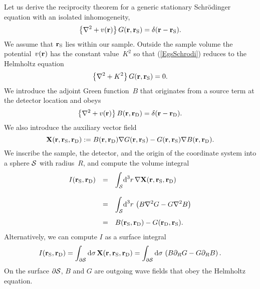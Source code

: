 Let us derive the reciprocity theorem
for a generic stationary Schrödinger equation
with an isolated inhomogeneity,
\begin{equation}\label{EgsSchrodi}
  \left\{\mathbf{\nabla}^2+v(\mathbf{r})\right\}G(\mathbf{r},\mathbf{r}_\text{S}) = \delta(\mathbf{r}-\mathbf{r}_\text{S}).
\end{equation}
We assume that $\mathbf{r}_\text{S}$ lies within our sample.
Outside the sample volume
the potential~$v(\mathbf{r})$ has the constant value~$K^2$
so that (\ref{EgsSchrodi})
reduces to the Helmholtz equation%
\begin{equation}\label{EgsSchrodiHelmh}
  \left\{\mathbf{\nabla}^2+K^2\right\}G(\mathbf{r},\mathbf{r}_\text{S}) = 0.
\end{equation}
We introduce the adjoint Green function~$B$
%
that originates from a source term at the detector location
and obeys
\begin{equation}\label{EgsSchrodiAdj}
  \left\{\mathbf{\nabla}^2+v(\mathbf{r})\right\}B(\mathbf{r},\mathbf{r}_\text{D}) = \delta(\mathbf{r}-\mathbf{r}_\text{D}).
\end{equation}
We also introduce the auxiliary vector field
\begin{equation}
  \mathbf{X}(\mathbf{r},\mathbf{r}_\text{S},\mathbf{r}_\text{D}):=B(\mathbf{r},\mathbf{r}_\text{D})\mathbf{\nabla} G(\mathbf{r},\mathbf{r}_\text{S}) - G(\mathbf{r},\mathbf{r}_\text{S})\mathbf{\nabla} B(\mathbf{r},\mathbf{r}_\text{D}).
\end{equation}
%
We inscribe the sample, the detector, and the origin of the coordinate system
into a sphere $\mathcal{S}$ with radius~$R$,
%
%
and compute the volume integral
\begin{equation}\label{Eprerecipro}
  \begin{array}{lcl}
    I(\mathbf{r}_\text{S},\mathbf{r}_\text{D})
  &=& \displaystyle\int_{\mathcal{S}}\!\text{d}^3r\,\mathbf{\nabla} \mathbf{X}(\mathbf{r},\mathbf{r}_\text{S},\mathbf{r}_\text{D})
  \\[1.8em]
  &=& \displaystyle\int_{\mathcal{S}}\!\text{d}^3r\,\left(
    B\mathbf{\nabla}^2 G- G\mathbf{\nabla}^2 B \right)
  \\[1.4em]
  &=&  B(\mathbf{r}_\text{S},\mathbf{r}_\text{D}) - G(\mathbf{r}_\text{D},\mathbf{r}_\text{S}).
  \end{array}
\end{equation}
Alternatively, we can compute $I$ as a surface integral
\begin{equation}
  I(\mathbf{r}_\text{S},\mathbf{r}_\text{D})
  =\displaystyle\int_{\partial\mathcal{S}}\text{d}\mathbf{\sigma}\,\mathbf{X}(\mathbf{r},\mathbf{r}_\text{S},\mathbf{r}_\text{D})
  =\displaystyle\int_{\partial\mathcal{S}}\text{d}{\sigma}\,
       \left(B\partial_R G - G\partial_R B\right).
\end{equation}
On the surface $\partial\mathcal{S}$,
$B$ and $G$ are outgoing wave fields that obey the Helmholtz equation.
